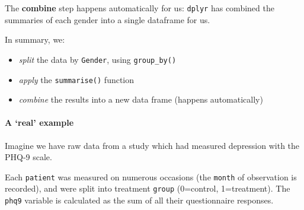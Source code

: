 \documentclass[]{article}
\providecommand{\tightlist}{%
  \setlength{\itemsep}{0pt}\setlength{\parskip}{0pt}}
\let\oldparagraph\paragraph
\renewcommand{\paragraph}[1]{\oldparagraph{#1}\mbox{}}
\begin{document}
The \textbf{combine} step happens automatically for us: \texttt{dplyr} has combined the
summaries of each gender into a single dataframe for us.

In summary, we:

\begin{itemize}
\tightlist
\item
  \emph{split} the data by \texttt{Gender}, using \texttt{group\_by()}
\item
  \emph{apply} the \texttt{summarise()} function
\item
  \emph{combine} the results into a new data frame (happens automatically)
\end{itemize}

\hypertarget{a-real-example}{%
\paragraph{A `real' example}\label{a-real-example}}

Imagine we have raw data from a study which had measured depression with the
PHQ-9 scale.

Each \texttt{patient} was measured on numerous occasions (the \texttt{month} of observation is
recorded), and were split into treatment \texttt{group} (0=control, 1=treatment). The
\texttt{phq9} variable is calculated as the sum of all their questionnaire responses.
\end{document}
